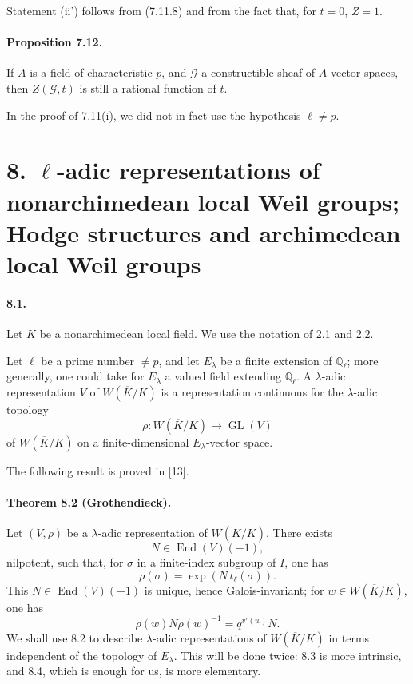 \documentclass[10pt]{article}
\newcommand{\GL}{\operatorname{GL}}
\providecommand{\GL}{\operatorname{GL}}
\providecommand{\End}{\operatorname{End}}
\providecommand{\GL}{\operatorname{GL}}
\providecommand{\End}{\operatorname{End}}
\begin{document}
Statement (ii') follows from (7.11.8) and from the fact that, for \(t=0\), \(Z=1\).

\paragraph{Proposition 7.12.} If \(A\) is a field of characteristic \(p\), and \(\mathcal G\) a constructible sheaf of \(A\)-vector spaces, then \(Z(\mathcal G,t)\) is still a rational function of \(t\).

In the proof of 7.11(i), we did not in fact use the hypothesis \(\ell\ne p\).

\section*{8. \(\ell\)-adic representations of nonarchimedean local Weil groups; Hodge structures and archimedean local Weil groups}

\paragraph{8.1.} Let \(K\) be a nonarchimedean local field. We use the notation of 2.1 and 2.2.

Let \(\ell\) be a prime number \(\ne p\), and let \(E_\lambda\) be a finite extension of \(\mathbb Q_\ell\); more generally, one could take for \(E_\lambda\) a valued field extending \(\mathbb Q_\ell\). A \(\lambda\)-adic representation \(V\) of \(W(\overline K/K)\) is a representation continuous for the \(\lambda\)-adic topology
\[
\rho:W(\overline K/K)\longrightarrow\GL(V)
\]
of \(W(\overline K/K)\) on a finite-dimensional \(E_\lambda\)-vector space.

The following result is proved in [13].

\paragraph{Theorem 8.2 (Grothendieck).} Let \((V,\rho)\) be a \(\lambda\)-adic representation of \(W(\overline K/K)\). There exists
\[
N\in\End(V)(-1),
\]
nilpotent, such that, for \(\sigma\) in a finite-index subgroup of \(I\), one has
\[
\rho(\sigma)=\exp(N\,t_\ell(\sigma)).
\]
This \(N\in\End(V)(-1)\) is unique, hence Galois-invariant; for \(w\in W(\overline K/K)\), one has
\[
\rho(w)N\rho(w)^{-1}=q^{v'(w)}N.
\]
We shall use 8.2 to describe \(\lambda\)-adic representations of \(W(\overline K/K)\) in terms independent of the topology of \(E_\lambda\). This will be done twice: 8.3 is more intrinsic, and 8.4, which is enough for us, is more elementary.
\end{document}
